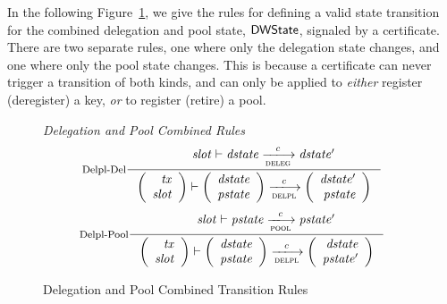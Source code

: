 In the following Figure~\ref{fig:rules:delpl}, we give the rules for
defining a valid state transition for the combined delegation and pool
state, $\mathsf{DWState}$, signaled by a certificate. There are two separate rules,
one where only the
delegation state changes, and one where only the pool state changes.
This is because a certificate can never trigger a transition of both kinds,
and can only be applied to \textit{either} register (deregister) a key,
\textit{or} to register (retire) a pool.

\begin{figure}
  \emph{Delegation and Pool Combined Rules}
  \begin{equation}
    \label{eq:delpl-d}
    \inference[Delpl-Del]
    {
      & \var{slot} \vdash \var{dstate} \trans{deleg}{c} \var{dstate'}
    }
    { \left(
      \begin{array}{r}
        \var{tx} \\
        \var{slot}
      \end{array}
      \right)
      \vdash
      \left(
      \begin{array}{r}
        \var{dstate} \\
        \var{pstate}
      \end{array}
      \right)
      \trans{delpl}{c}
      \left(
      \begin{array}{rcl}
        \var{dstate'} \\
        \var{pstate}
      \end{array}
      \right)
    }
  \end{equation}
    \begin{equation}
    \label{eq:delpl-p}
    \inference[Delpl-Pool]
    {
    & \var{slot} \vdash \var{pstate} \trans{pool}{c} \var{pstate'}
    }
    { \left(
      \begin{array}{r}
        \var{tx} \\
        \var{slot}
      \end{array}
      \right)
      \vdash
      \left(
      \begin{array}{r}
        \var{dstate} \\
        \var{pstate}
      \end{array}
      \right)
      \trans{delpl}{c}
      \left(
      \begin{array}{rcl}
        \var{dstate} \\
        \var{pstate'}
      \end{array}
      \right)
    }
  \end{equation}
  \caption{Delegation and Pool Combined Transition Rules}
  \label{fig:rules:delpl}
\end{figure}


